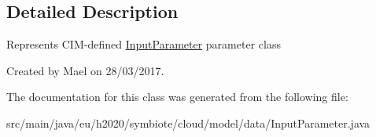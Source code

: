 \subsection{Detailed Description}
Represents C\+I\+M-\/defined \hyperlink{classeu_1_1h2020_1_1symbiote_1_1cloud_1_1model_1_1data_1_1InputParameter}{Input\+Parameter} parameter class

Created by Mael on 28/03/2017. 

The documentation for this class was generated from the following file\+:\begin{DoxyCompactItemize}
\item 
src/main/java/eu/h2020/symbiote/cloud/model/data/Input\+Parameter.\+java\end{DoxyCompactItemize}

